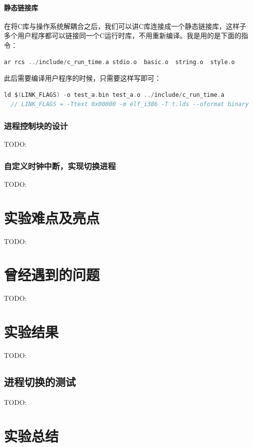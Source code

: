 \documentclass[forprint]{WHUBachelor}
\begin{document}
\subsubsection{静态链接库}

在将C库与操作系统解耦合之后，我们可以讲C库连接成一个静态链接库，这样子多个用户程序都可以链接同一个C运行时库，不用重新编译。我是用的是下面的指令：

\begin{lstlisting}[language=c]
	ar rcs ../include/c_run_time.a stdio.o  basic.o  string.o  style.o
\end{lstlisting}

此后需要编译用户程序的时候，只需要这样写即可：

\begin{lstlisting}[language=c]
  ld $(LINK_FLAGS) -o test_a.bin test_a.o ../include/c_run_time.a
  // LINK_FLAGS = -Ttext 0x00000 -m elf_i386 -T t.lds --oformat binary
\end{lstlisting}


\subsection{进程控制块的设计}
TODO:


\subsection{自定义时钟中断，实现切换进程}
TODO:


\chapter{实验难点及亮点}
TODO:

\chapter{曾经遇到的问题}
TODO:

\chapter{实验结果}
TODO:

\section{进程切换的测试}
TODO:

\chapter{实验总结}
\end{document}
